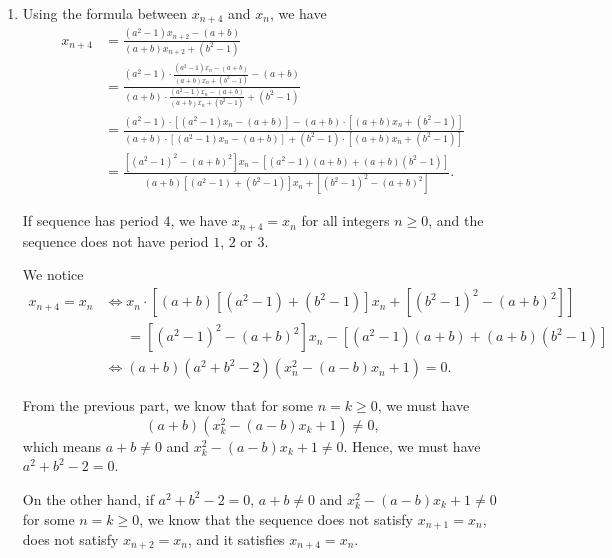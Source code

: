 \begin{enumerate}
    \item Using the formula between \(x_{n + 4}\) and \(x_n\), we have
          \begin{align*}
              x_{n + 4} & = \frac{(a^2 - 1) x_{n + 2} - (a + b)}{(a + b) x_{n + 2} + (b^2 - 1)}                                                                                                                                                         \\
                        & = \frac{(a^2 - 1) \cdot \frac{(a^2 - 1) x_n - (a + b)}{(a + b) x_n + (b^2 - 1)} - (a + b)}{(a + b) \cdot \frac{(a^2 - 1) x_n - (a + b)}{(a + b) x_n + (b^2 - 1)} + (b^2 - 1)}                                                 \\
                        & = \frac{(a^2 - 1) \cdot \left[(a^2 - 1) x_n - (a + b)\right] - (a + b) \cdot \left[(a + b) x_n + (b^2 - 1)\right]}{(a + b) \cdot \left[(a^2 - 1) x_n - (a + b)\right] + (b^2 - 1) \cdot \left[(a + b) x_n + (b^2 - 1)\right]} \\
                        & = \frac{\left[(a^2 - 1)^2 - (a + b)^2\right] x_n - \left[(a^2 - 1)(a + b) + (a + b)(b^2 - 1)\right]}{(a + b)\left[(a^2 - 1) + (b^2 - 1)\right] x_n + \left[(b^2 - 1)^2 - (a + b)^2\right]}.
          \end{align*}

          If sequence has period \(4\), we have \(x_{n + 4} = x_n\) for all integers \(n \geq 0\), and the sequence does not have period \(1\), \(2\) or \(3\).

          We notice
          \begin{align*}
              x_{n + 4} = x_n & \iff x_n \cdot \left[(a + b)\left[(a^2 - 1) + (b^2 - 1)\right] x_n + \left[(b^2 - 1)^2 - (a + b)^2\right]\right] \\
                              & \phantom{\iff} = \left[(a^2 - 1)^2 - (a + b)^2\right] x_n - \left[(a^2 - 1)(a + b) + (a + b)(b^2 - 1)\right]     \\
                              & \iff (a + b) (a^2 + b^2 - 2) \left(x_n^2 - (a - b)x_n + 1 \right) = 0.
          \end{align*}

          From the previous part, we know that for some \(n = k \geq 0\), we must have
          \[
              (a + b) \left(x_k^2 - (a - b)x_k + 1 \right) \neq 0,
          \]
          which means \(a + b \neq 0\) and \(x_k^2 - (a - b) x_k + 1 \neq 0\). Hence, we must have \(a^2 + b^2 - 2 = 0\).

          On the other hand, if \(a^2 + b^2 - 2 = 0\), \(a + b \neq 0\) and \(x_k^2 - (a - b) x_k + 1 \neq 0\) for some \(n = k \geq 0\), we know that the sequence does not satisfy \(x_{n + 1} = x_n\), does not satisfy \(x_{n + 2} = x_n\), and it satisfies \(x_{n + 4} = x_n\).


\end{enumerate}
